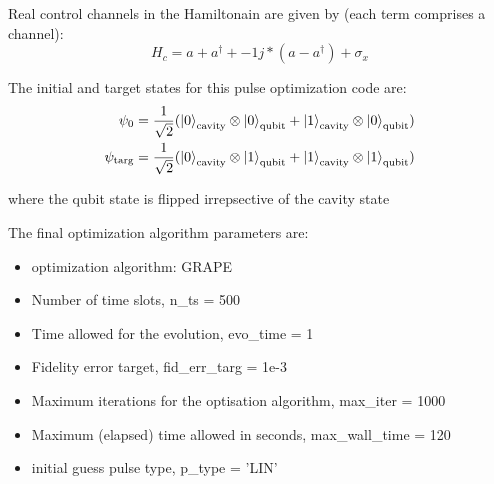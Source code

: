 \documentclass[12pt]{report}
\begin{document}
Real control channels in the Hamiltonain are given by (each term comprises a channel): 
\begin{equation}
    H_c = a + a^{\dagger} + -1j*(a - a^{\dagger}) + \sigma_x    
\end{equation}

The initial and target states for this pulse optimization code are: 
\begin{align*}
    \psi_0 &= \frac{1}{\sqrt{2}} (\ket{0}_{\text{cavity}} \otimes \ket{0}_{\text{qubit}} 
                + \ket{1}_{\text{cavity}} \otimes \ket{0}_{\text{qubit}})\\
    \psi_{\text{targ}} &= \frac{1}{\sqrt{2}} (\ket{0}_{\text{cavity}} \otimes \ket{1}_{\text{qubit}} 
                + \ket{1}_{\text{cavity}} \otimes \ket{1}_{\text{qubit}})\\
\end{align*}

where the qubit state is flipped irrepsective of the cavity state
\par
The final optimization algorithm parameters are:
\begin{itemize}
    \item optimization algorithm: GRAPE
    \item Number of time slots, n\_ts = 500
    \item Time allowed for the evolution, evo\_time = 1
    \item Fidelity error target, fid\_err\_targ = 1e-3
    \item Maximum iterations for the optisation algorithm, max\_iter = 1000
    \item Maximum (elapsed) time allowed in seconds, max\_wall\_time = 120
    \item initial guess pulse type, p\_type = 'LIN'
\end{itemize}
\end{document}
